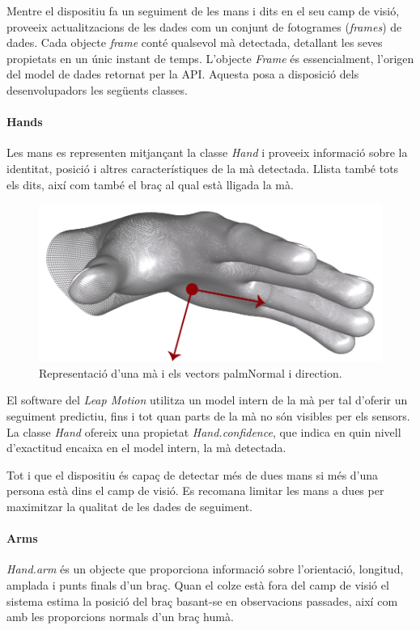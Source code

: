 \documentclass[12pt,a4paper,catalan]{article}
\begin{document}
	\vspace{5mm}
	Mentre el dispositiu fa un seguiment de les mans i dits en el seu camp de visió, proveeix actualitzacions de les dades com un conjunt de fotogrames (\textit{frames}) de dades. Cada objecte \textit{frame} conté qualsevol mà detectada, detallant les seves propietats en un únic instant de temps. L'objecte \textit{Frame} és essencialment, l'origen del model de dades retornat per la API.
	Aquesta posa a disposició dels desenvolupadors les següents classes.
	
	\paragraph{Hands}
	Les mans es representen mitjançant la classe \textit{Hand} i proveeix informació sobre la identitat, posició i altres característiques de la mà detectada. Llista també tots els dits, així com també el braç al qual està lligada la mà.
	\begin{figure}[H]
		\includegraphics[width=\textwidth,keepaspectratio]{leap-hand-model.png}
		\centering
		\caption{Representació d'una mà i els vectors palmNormal i direction.}
		\label{fig:leap-hand}
	\end{figure}
	El software del \textit{Leap Motion} utilitza un model intern de la mà per tal d'oferir un seguiment predictiu, fins i tot quan parts de la mà no són visibles per els sensors. La classe \textit{Hand} ofereix una propietat \textit{Hand.confidence}, que indica en quin nivell d'exactitud encaixa en el model intern, la mà detectada.
	
	Tot i que el dispositiu és capaç de detectar més de dues mans si més d'una persona està dins el camp de visió. Es recomana limitar les mans a dues per maximitzar la qualitat de les dades de seguiment.
	\paragraph{Arms}
	\textit{Hand.arm} és un objecte que proporciona informació sobre l'orientació, longitud, amplada i punts finals d'un braç. Quan el colze està fora del camp de visió el sistema estima la posició del braç basant-se en observacions passades, així com amb les proporcions normals d'un braç humà.
\end{document}
